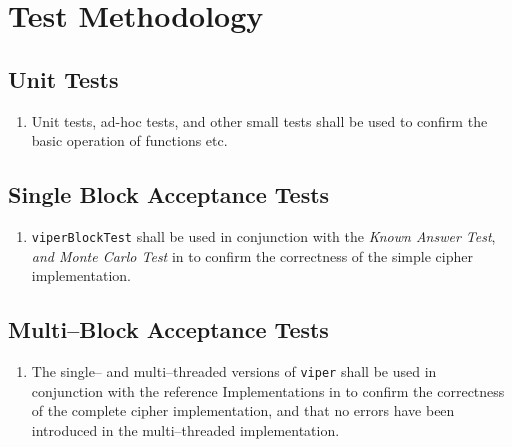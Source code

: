 \section{Test Methodology}

\subsection{Unit Tests}
\begin{enumerate}
\item Unit tests, ad-hoc tests, and other small tests shall be used to confirm the basic operation of functions etc.
\end{enumerate}


\subsection{Single Block Acceptance Tests}
\begin{enumerate}
\item \texttt{viperBlockTest} shall be used in conjunction with the \emph{Known Answer Test}, \emph{and Monte Carlo Test} in \cite{submission-files} to confirm the correctness of the simple cipher implementation.
\end{enumerate}

\subsection{Multi--Block Acceptance Tests}
\begin{enumerate}
\item The single-- and multi--threaded versions of \texttt{viper} shall be used in conjunction with the reference Implementations in \cite{submission-files, referenceImplementation} to confirm the correctness of the complete cipher implementation, and that no errors have been introduced in the multi--threaded implementation.
\end{enumerate}

